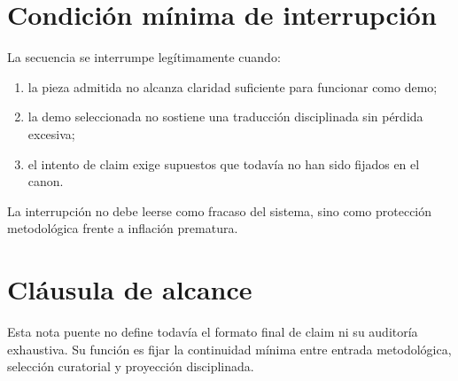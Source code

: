 \section{Condición mínima de interrupción}
\begin{definition}
La secuencia se interrumpe legítimamente cuando:
\begin{enumerate}
  \item la pieza admitida no alcanza claridad suficiente para funcionar como demo;
  \item la demo seleccionada no sostiene una traducción disciplinada sin pérdida excesiva;
  \item el intento de claim exige supuestos que todavía no han sido fijados en el canon.
\end{enumerate}
\end{definition}

\begin{observation}
La interrupción no debe leerse como fracaso del sistema, sino como protección metodológica frente a inflación prematura.
\end{observation}

\section{Cláusula de alcance}
\begin{observation}
Esta nota puente no define todavía el formato final de claim ni su auditoría exhaustiva. Su función es fijar la continuidad mínima entre entrada metodológica, selección curatorial y proyección disciplinada.
\end{observation}

